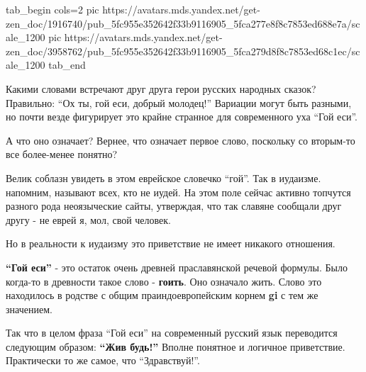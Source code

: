 \ifcmt
	tab_begin cols=2
	  pic https://avatars.mds.yandex.net/get-zen_doc/1916740/pub_5fc955e352642f33b9116905_5fca277e8f8c7853ed688e7a/scale_1200
	  pic https://avatars.mds.yandex.net/get-zen_doc/3958762/pub_5fc955e352642f33b9116905_5fca279d8f8c7853ed68c1ec/scale_1200
	tab_end
\fi

Какими словами встречают друг друга герои русских народных сказок? Правильно:
\enquote{Ох ты, гой еси, добрый молодец!} Вариации могут быть разными, но почти везде
фигурирует это крайне странное для современного уха \enquote{Гой еси}.

А что оно означает? Вернее, что означает первое слово, поскольку со вторым-то
все более-менее понятно?

Велик соблазн увидеть в этом еврейское словечко \enquote{гой}. Так в иудаизме.
напомним, называют всех, кто не иудей. На этом поле сейчас активно топчутся
разного рода неоязыческие сайты, утверждая, что так славяне сообщали друг другу
- не еврей я, мол, свой человек.

Но в реальности к иудаизму это приветствие не имеет никакого отношения.

\textbf{\enquote{Гой еси}} - это остаток очень древней праславянской речевой формулы. Было
когда-то в древности такое слово - \textbf{гоить}. Оно означало жить. Слово это
находилось в родстве с общим праиндоевропейским корнем \textbf{gi} с тем же значением.

Так что в целом фраза \enquote{Гой еси} на современный русский язык переводится
следующим образом: \textbf{\enquote{Жив будь!}} Вполне понятное и логичное приветствие.
Практически то же самое, что \enquote{Здравствуй!}.

